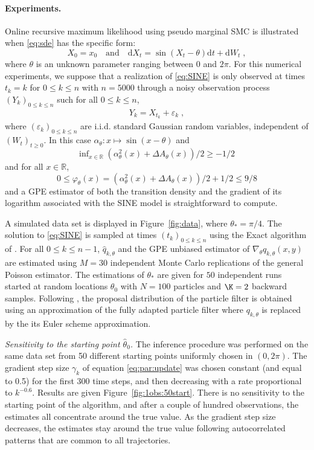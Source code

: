 \documentclass{article}
\newcommand{\parvec}{\theta}
\newcommand{\hd}[1]{q_{#1}}
\newcommand{\N}{N}
\newcommand{\rset}{\ensuremath{\mathbb{R}}}
\newcommand{\rmd}{\ensuremath{\mathrm{d}}}
\newcommand{\eqsp}{\;}
\begin{document}
\paragraph{Experiments.}
Online recursive maximum likelihood using pseudo marginal SMC is illustrated when \eqref{eq:sde} has the specific form:
\begin{equation}
\label{eq:SINE}
X_0 = x_0 \quad\mbox{and}\quad \rmd X_t = \sin(X_t - \parvec)\rmd t + \rmd W_t\eqsp,
\end{equation}
where $\parvec$ is an unknown parameter ranging between 0 and $2\pi$. For this numerical experiments, we suppose that a realization of \eqref{eq:SINE} is only observed at times $t_k = k$ for $0\leqslant k\leqslant n$ with $n=5000$ through a noisy observation process $(Y_k)_{0\leqslant k\leqslant n}$ such for all $0\leqslant k\leqslant n$,
\begin{align*}
Y_k = X_{t_k} + \varepsilon_k\eqsp,
\end{align*}
where $(\varepsilon_k)_{0\leqslant k \leqslant n}$ are i.i.d. standard Gaussian random variables, independent of $(W_t)_{t\geqslant 0}$. In this case $\alpha_{\theta}: x\mapsto \sin(x-\parvec)$ and 
\[
\mathrm{inf}_{x\in \rset}\; (\alpha^2_{\parvec}(x) + \Delta A_{\parvec}(x))/2 \geqslant  -1/2
\]
and for all $x\in\rset$,
\[
0\leqslant \varphi_{\parvec}(x) =  (\alpha^2_{\parvec}(x) + \Delta A_{\parvec}(x))/2 + 1/2 \leqslant 9/8
\]
and a GPE estimator of both the transition density and the gradient of its logarithm associated with the SINE model is straightforward to compute. 

A simulated data set is displayed in Figure~\ref{fig:data}, where $\parvec_* = \pi/4$. The solution to \eqref{eq:SINE} is sampled at times $(t_k)_{0\leqslant k\leqslant n}$  using the Exact algorithm of \cite{beskos2006retrospective}. 
For all  $0\leqslant k \leqslant n-1$,  $\widehat{q}_{k,\parvec}$ and the GPE unbiased estimator of $\nabla_{\parvec}q_{k,\parvec}(x,y)$ are estimated using $M = 30$ independent Monte Carlo replications of the general Poisson estimator. 
The estimations of $\parvec_*$ are given for $50$ independent runs started at random locations $\theta_0$ with $\N = 100$ particles and $\K = 2$ backward samples. Following \cite{gloaguen:etienne:lecorff:2018}, the proposal distribution of the particle filter is obtained using an approximation of the fully adapted particle filter where $\hd{k,\parvec}$ is replaced by the its Euler scheme approximation.


{\em Sensitivity to the starting point $\hat{\parvec}_0$.}
The inference procedure was performed on the same data set from 50 different starting points uniformly chosen in $(0,2\pi)$. The gradient step size $\gamma_k$ of equation \eqref{eq:par:update} was chosen constant (and equal to 0.5) for the first 300 time steps, and then decreasing with a rate proportional to $k^{-0.6}$. Results are given Figure~\ref{fig:1obs:50start}. There is no sensitivity to the starting point of the algorithm, and after a couple of hundred observations, the estimates all concentrate around the true value. As the gradient step size decreases, the estimates stay around the true value following autocorrelated patterns that are common to all trajectories.
\end{document}
